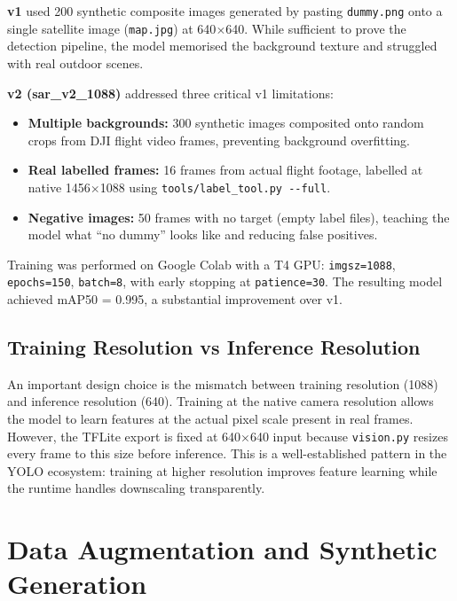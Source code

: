 \textbf{v1} used 200 synthetic composite images generated by pasting
\texttt{dummy.png} onto a single satellite image (\texttt{map.jpg}) at
640$\times$640. While sufficient to prove the detection pipeline, the model
memorised the background texture and struggled with real outdoor scenes.

\textbf{v2 (sar\_v2\_1088)} addressed three critical v1 limitations:
\begin{itemize}
    \item \textbf{Multiple backgrounds:} 300 synthetic images composited onto
          random crops from DJI flight video frames, preventing background overfitting.
    \item \textbf{Real labelled frames:} 16 frames from actual flight footage,
          labelled at native 1456$\times$1088 using \texttt{tools/label\_tool.py -{}-full}.
    \item \textbf{Negative images:} 50 frames with no target (empty label files),
          teaching the model what ``no dummy'' looks like and reducing false positives.
\end{itemize}

Training was performed on Google Colab with a T4 GPU: \texttt{imgsz=1088},
\texttt{epochs=150}, \texttt{batch=8}, with early stopping at \texttt{patience=30}.
The resulting model achieved mAP50 = 0.995, a substantial improvement over v1.

\subsection{Training Resolution vs Inference Resolution}

An important design choice is the mismatch between training resolution (1088) and
inference resolution (640). Training at the native camera resolution allows the
model to learn features at the actual pixel scale present in real frames. However,
the TFLite export is fixed at 640$\times$640 input because \texttt{vision.py}
resizes every frame to this size before inference. This is a well-established
pattern in the YOLO ecosystem: training at higher resolution improves feature
learning while the runtime handles downscaling transparently.


\section{Data Augmentation and Synthetic Generation}
\label{sec:data-augmentation}

